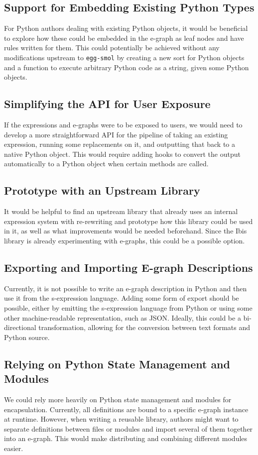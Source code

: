 \documentclass[sigplan,screen,review]{acmart}
\begin{document}
\subsection{Support for Embedding Existing Python Types}
For Python authors dealing with existing Python objects, it would be beneficial to explore how these could be embedded in the e-graph as leaf nodes and have rules written for them. This could potentially be achieved without any modifications upstream to \verb|egg-smol| by creating a new sort for Python objects and a function to execute arbitrary Python code as a string, given some Python objects.

\subsection{Simplifying the API for User Exposure}
If the expressions and e-graphs were to be exposed to users, we would need to develop a more straightforward API for the pipeline of taking an existing expression, running some replacements on it, and outputting that back to a native Python object. This would require adding hooks to convert the output automatically to a Python object when certain methods are called.

\subsection{Prototype with an Upstream Library}
It would be helpful to find an upstream library that already uses an internal expression system with re-rewriting and prototype how this library could be used in it, as well as what improvements would be needed beforehand. Since the Ibis library is already experimenting with e-graphs, this could be a possible option.

\subsection{Exporting and Importing E-graph Descriptions}
Currently, it is not possible to write an e-graph description in Python and then use it from the s-expression language. Adding some form of export should be possible, either by emitting the s-expression language from Python or using some other machine-readable representation, such as JSON. Ideally, this could be a bi-directional transformation, allowing for the conversion between text formats and Python source.

\subsection{Relying on Python State Management and Modules}
We could rely more heavily on Python state management and modules for encapsulation. Currently, all definitions are bound to a specific e-graph instance at runtime. However, when writing a reusable library, authors might want to separate definitions between files or modules and import several of them together into an e-graph. This would make distributing and combining different modules easier.
\end{document}
